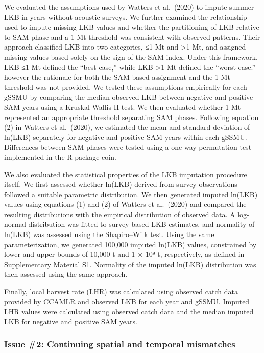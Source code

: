 \documentclass[]{elsarticle} %
\begin{document}
We evaluated the assumptions used by Watters et al.~(2020) to impute
summer LKB in years without acoustic surveys. We further examined the
relationship used to impute missing LKB values and whether the
partitioning of LKB relative to SAM phase and a 1 Mt threshold was
consistent with observed patterns. Their approach classified LKB into
two categories, ≤1 Mt and \textgreater1 Mt, and assigned missing values
based solely on the sign of the SAM index. Under this framework, LKB ≤1
Mt defined the ``best case,'' while LKB \textgreater1 Mt defined the
``worst case.'' however the rationale for both the SAM-based assignment
and the 1 Mt threshold was not provided. We tested these assumptions
empirically for each gSSMU by comparing the median observed LKB between
negative and positive SAM years using a Kruskal-Wallis H test. We then
evaluated whether 1 Mt represented an appropriate threshold separating
SAM phases. Following equation (2) in Watters et al.~(2020), we
estimated the mean and standard deviation of ln(LKB) separately for
negative and positive SAM years within each gSSMU. Differences between
SAM phases were tested using a one-way permutation test implemented in
the R package coin.

We also evaluated the statistical properties of the LKB imputation
procedure itself. We first assessed whether ln(LKB) derived from survey
observations followed a suitable parametric distribution. We then
generated imputed ln(LKB) values using equations (1) and (2) of Watters
et al.~(2020) and compared the resulting distributions with the
empirical distribution of observed data. A log-normal distribution was
fitted to survey-based LKB estimates, and normality of ln(LKB) was
assessed using the Shapiro--Wilk test. Using the same parameterization,
we generated 100,000 imputed ln(LKB) values, constrained by lower and
upper bounds of 10,000 t and 1 × 10⁹ t, respectively, as defined in
Supplementary Material S1. Normality of the imputed ln(LKB) distribution
was then assessed using the same approach.

Finally, local harvest rate (LHR) was calculated using observed catch
data provided by CCAMLR and observed LKB for each year and gSSMU.
Imputed LHR values were calculated using observed catch data and the
median imputed LKB for negative and positive SAM years.

\subsubsection{Issue \#2: Continuing spatial and temporal
mismatches}\label{issue-2-continuing-spatial-and-temporal-mismatches}
\end{document}

